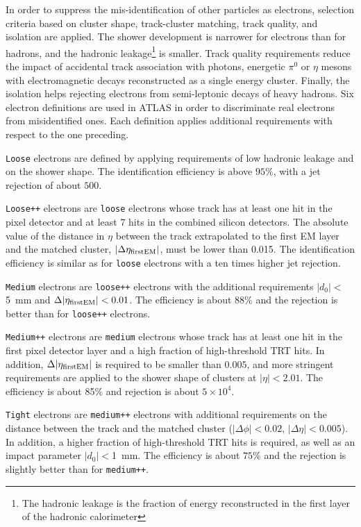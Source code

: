 In order to suppress the mis-identification of other particles  
as electrons, selection criteria based on cluster shape, 
track-cluster matching, track quality, and isolation are applied.
The shower development is narrower for electrons than for hadrons, and
the hadronic leakage\footnote{The hadronic leakage is the fraction of 
energy reconstructed in the first layer of the hadronic calorimeter}
is smaller. Track quality requirements reduce the impact of accidental 
track association with photons, energetic $\pi^0$ or $\eta$ mesons
with electromagnetic decays reconstructed as a single energy cluster.
Finally, the isolation helps rejecting electrons from semi-leptonic
decays of  heavy hadrons.
Six electron definitions are used in ATLAS in order to discriminate
real electrons from misidentified ones. Each definition applies
additional requirements with respect to the one preceding.

\texttt{Loose} electrons are defined by applying requirements of low
hadronic leakage and on the shower shape.
The identification efficiency is above $95\%$, with a jet
rejection of about $500$.

\texttt{Loose++} electrons are \texttt{loose} electrons whose track
has at least one hit in  the pixel detector and at least 7 hits in the
combined silicon detectors. The absolute value of the distance in
$\eta$ between the track extrapolated to the first EM layer and the
matched cluster, $|\Delta\eta_{\rm first EM}|$, must be lower than
0.015. The identification efficiency is similar as for \texttt{loose}
electrons with a ten times higher jet rejection.

\texttt{Medium} electrons are \texttt{loose++} electrons with
the additional requirements $|d_0|<$5~mm and $\Delta|\eta_{\rm first
  EM}|<0.01$. The efficiency is about 88\% and the rejection is better
than for \texttt{loose++} electrons.

\texttt{Medium++} electrons are \texttt{medium} electrons whose track
has at least one hit in the first pixel detector layer and a high
fraction of high-threshold TRT hits. In addition, $\Delta|\eta_{\rm
  first EM}|$ is required to be smaller than $0.005$, and more
stringent requirements are applied to the shower shape of clusters at
$|\eta|<2.01$. The efficiency is about 85\% and rejection is about
$5\times 10^4$.

\texttt{Tight} electrons are \texttt{medium++} electrons with
additional requirements on the distance between the track and the
matched cluster ($|\Delta\phi|<0.02$, $|\Delta\eta|<0.005$). 
In addition, a higher fraction of high-threshold TRT hits is required, as well as
 an impact parameter $|d_0|<$1~mm. 
The efficiency is about $75\%$ and the rejection is slightly better
than for \texttt{medium++}.

